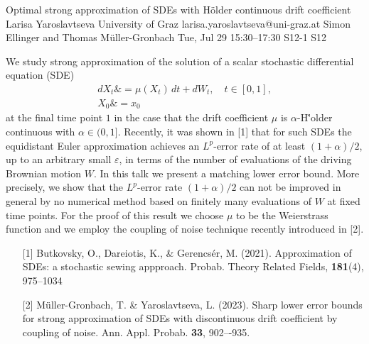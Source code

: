 \begin{talk}
  {Optimal strong approximation of SDEs with H\"older continuous drift coefficient}%
  {Larisa Yaroslavtseva}%
  {University of Graz}%
  {larisa.yaroslavtseva@uni-graz.at}%
  {Simon Ellinger and Thomas Müller-Gronbach}%
  {}%
  {Tue, Jul 29 15:30–17:30}%
  {S12-1}%
  {S12}%
  
				
			
We study strong approximation of the solution of a scalar stochastic differential equation (SDE)
\begin{equation}\label{sde0}
	\begin{aligned}
		dX_t \& = \mu(X_t) \, dt +  dW_t, \quad t\in [0,1],\\
		X_0 \& = x_0
	\end{aligned}
\end{equation}
at the final time point $1$
in the case that  the drift coefficient  $\mu$ is $\alpha$-H\''older continuous with $\alpha\in(0, 1]$.
Recently, it was  shown in [1] that for such SDEs the equidistant Euler approximation achieves an $L^p$-error rate of at least $(1+\alpha)/2$, up to an arbitrary small $\varepsilon$,
in terms of the number of evaluations of the driving Brownian motion $W$.
In this talk  we  
present a matching  lower error bound.   More precisely, we show that
the $L^p$-error rate $(1+\alpha)/2$ can
not be improved in general by  no numerical 
method based on finitely many evaluations of $W$ at fixed time points. For the proof of this result we choose  $\mu$ to be the Weierstrass function and we employ  the coupling of noise technique  recently introduced in [2].




\begin{enumerate}
	\item[{[1]}] Butkovsky, O., Dareiotis, K., \& Gerencs\'er, M. (2021). Approximation of SDEs: a stochastic sewing appproach. Probab. Theory Related Fields, \textbf{181}(4), 975--1034
	\item[{[2]}] Müller-Gronbach, T.  \& Yaroslavtseva, L. (2023). Sharp lower error bounds for strong approximation of
	SDEs with discontinuous drift coefficient by coupling of noise. Ann. Appl. Probab. \textbf{33}, 902–-935.
\end{enumerate}


\end{talk}

